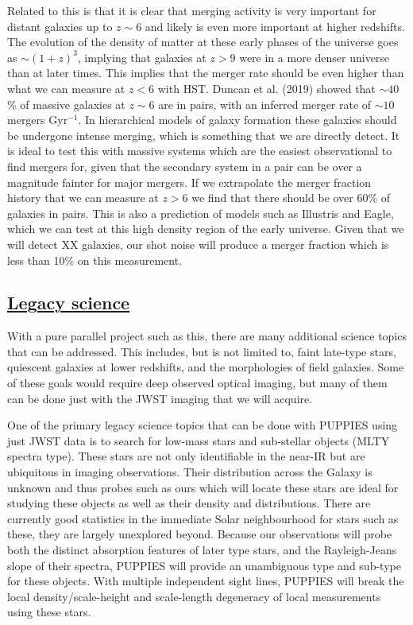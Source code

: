 \documentclass[12pt]{article}
\begin{document}
Related to this is that it is clear that merging activity is very important for distant galaxies up to $z \sim 6$ and likely is even more important at higher redshifts.  The evolution of the density of matter at these early phases of the universe goes as $\sim (1+z)^{3}$, implying that galaxies at $z > 9$ were in a more denser universe than at later times. This implies that the merger rate should be even higher than what we can measure at $z < 6$ with HST.  Duncan et al. (2019) showed that $\sim 40$\% of massive galaxies at $z \sim 6$ are in pairs, with an inferred merger rate of $\sim 10$ mergers Gyr$^{-1}$.  In hierarchical models of galaxy formation these galaxies should be undergone intense merging, which is something that we are directly detect. It is ideal to test this with massive systems which are the easiest observational to find mergers for, given that the secondary system in a pair can be over a magnitude fainter for major mergers.  If we extrapolate the merger fraction history that we can measure at $z > 6$ we find that there should be over 60\% of galaxies in pairs.  This is also a prediction of models such as Illustris and Eagle, which we can test at this high density region of the early universe.  Given that we will detect XX galaxies, our shot noise will produce a merger fraction which is less than 10\% on this measurement.  




\subsection{\bf \underline{Legacy science}}

With a pure parallel project such as this, there are many additional science topics that can be addressed.  This includes, but is not limited to, faint late-type stars, quiescent galaxies at lower redshifts, and the morphologies of field galaxies.  Some of these goals would require deep observed optical imaging, but many of them can be done just with the JWST imaging that we will acquire.

One of the primary legacy science topics that can be done with PUPPIES using just JWST data is to search for low-mass stars and sub-stellar objects (MLTY spectra type).  These stars are not only identifiable in the near-IR but are ubiquitous in imaging observations.  Their distribution across the Galaxy is unknown and thus probes such as ours which will locate these stars are ideal for studying these objects as well as their density and distributions. There are currently good statistics in the immediate Solar neighbourhood for stars such as these, they are largely unexplored beyond. Because our observations will probe both the distinct absorption features of later type stars, and the Rayleigh-Jeans slope of their spectra,  PUPPIES will provide an unambiguous type and sub-type for these objects. With multiple independent sight lines, PUPPIES will break the local density/scale-height and scale-length degeneracy of local measurements using these stars.
\end{document}
